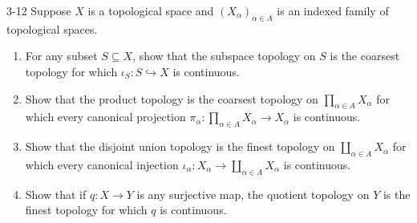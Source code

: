 \begin{problem}{3-12}
Suppose $X$ is a topological space and ${(X_{\alpha})}_{\alpha\in A}$ is an indexed family of topological spaces.
\begin{enumerate}[label={(\alph*)}]
    \item For any subset $S\subseteq X$, show that the subspace topology on $S$ is the coarsest topology for which $\iota_{S}: S\hookrightarrow{}X$ is continuous.
    \item Show that the product topology is the coarsest topology on $\prod_{\alpha\in A}X_{\alpha}$ for which every canonical projection $\pi_{\alpha}: \prod_{\alpha\in A}X_{\alpha} \to X_{\alpha}$ is continuous.
    \item Show that the disjoint union topology is the finest topology on $\coprod_{\alpha\in A}X_{\alpha}$ for which every canonical injection $\iota_{\alpha}: X_{\alpha} \to \coprod_{\alpha\in A}X_{\alpha}$ is continuous.
    \item Show that if $q: X\to Y$ is any surjective map, the quotient topology on $Y$ is the finest topology for which $q$ is continuous.
\end{enumerate}
\end{problem}

